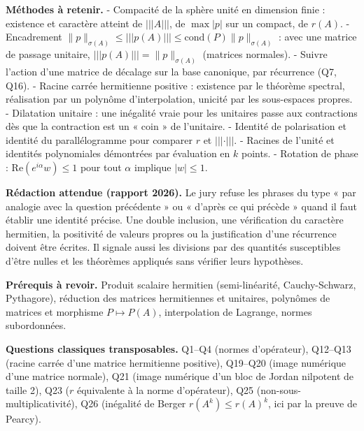 \documentclass[11pt,a4paper]{article}
\begin{document}
\textbf{Méthodes à retenir.}
- Compacité de la sphère unité en dimension finie : existence et caractère atteint de \(\vert\!\vert\!\vert A\vert\!\vert\!\vert\), de \(\max|p|\) sur un compact, de \(r(A)\).
- Encadrement \(\|p\|_{\sigma(A)}\le\vert\!\vert\!\vert p(A)\vert\!\vert\!\vert \le\mathrm{cond}(P)\|p\|_{\sigma(A)}\) : avec une matrice de passage unitaire, \(\vert\!\vert\!\vert p(A)\vert\!\vert\!\vert =\|p\|_{\sigma(A)}\) (matrices normales).
- Suivre l'action d'une matrice de décalage sur la base canonique, par récurrence (Q7, Q16).
- Racine carrée hermitienne positive : existence par le théorème spectral, réalisation par un polynôme d'interpolation, unicité par les sous-espaces propres.
- Dilatation unitaire : une inégalité vraie pour les unitaires passe aux contractions dès que la contraction est un « coin » de l'unitaire.
- Identité de polarisation et identité du parallélogramme pour comparer \(r\) et \(\vert\!\vert\!\vert \cdot\vert\!\vert\!\vert\).
- Racines de l'unité et identités polynomiales démontrées par évaluation en \(k\) points.
- Rotation de phase : \(\mathrm{Re}(e^{i\alpha}w)\le1\) pour tout \(\alpha\) implique \(|w|\le1\).

\textbf{Rédaction attendue (rapport 2026).} Le jury refuse les phrases du type « par analogie avec la question précédente » ou « d'après ce qui précède » quand il faut établir une identité précise. Une double inclusion, une vérification du caractère hermitien, la positivité de valeurs propres ou la justification d'une récurrence doivent être écrites. Il signale aussi les divisions par des quantités susceptibles d'être nulles et les théorèmes appliqués sans vérifier leurs hypothèses.

\textbf{Prérequis à revoir.} Produit scalaire hermitien (semi-linéarité, Cauchy-Schwarz, Pythagore), réduction des matrices hermitiennes et unitaires, polynômes de matrices et morphisme \(P\mapsto P(A)\), interpolation de Lagrange, normes subordonnées.

\textbf{Questions classiques transposables.} Q1--Q4 (normes d'opérateur), Q12--Q13 (racine carrée d'une matrice hermitienne positive), Q19--Q20 (image numérique d'une matrice normale), Q21 (image numérique d'un bloc de Jordan nilpotent de taille 2), Q23 (\(r\) équivalente à la norme d'opérateur), Q25 (non-\allowbreak{}sous-\allowbreak{}multiplicativité), Q26 (inégalité de Berger \(r(A^k)\le r(A)^k\), ici par la preuve de Pearcy).
\end{document}
